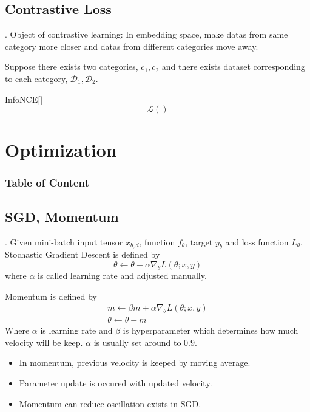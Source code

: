 \documentclass[8pt]{beamer}
\newcommand{\mc}[1]{\mathcal{#1}}
\begin{document}
\subsection{Contrastive Loss}

\begin{frame}{.}
    Object of contrastive learning: In embedding space, make datas from same category more closer and datas from different categories move away.

    \bigskip
    Suppose there exists two categories, $c_1, c_2$ and there exists dataset corresponding to each category, $\mc{D}_1, \mc{D}_2$.

    \begin{block}{InfoNCE[\cite{oord2018representation}]}
        \[
            \mc{L}()
        \]
    \end{block}
\end{frame}



\section{Optimization}
\begingroup
    \begin{frame}
        \frametitle{Table of Content}
        \tableofcontents
    \end{frame}
\endgroup
\subsection{SGD, Momentum}

\begin{frame}{.}
    Given mini-batch input tensor $x_{b,d}$, function $f_\theta$, target $y_b$ and loss function $L_\theta$, Stochastic Gradient Descent is defined by
    \[
        \theta \leftarrow \theta - \alpha \nabla_\theta L (\theta; x, y)
    \]
    where $\alpha$ is called learning rate and adjusted manually.

    \bigskip
    Momentum is defined by
    \[
    \begin{gathered}
        m \leftarrow \beta m + \alpha \nabla_\theta L(\theta;x,y) \\
        \theta \leftarrow \theta  - m
    \end{gathered}
    \]
    Where $\alpha$ is learning rate and $\beta$ is hyperparameter which determines how much velocity will be keep. $\alpha$ is usually set around to $0.9$.
    \begin{itemize}
        \item In momentum, previous velocity is keeped by moving average.
        \item Parameter update is occured with updated velocity.
        \item Momentum can reduce oscillation exists in SGD.
    \end{itemize}
\end{frame}
\end{document}
